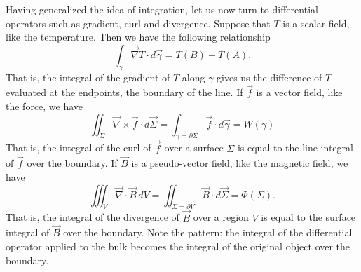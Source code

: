 Having generalized the idea of integration, let us now turn to differential operators such as gradient, curl and divergence. Suppose that $T$ is a scalar field, like the temperature. Then we have the following relationship
\begin{equation}\label{rp-cm-dg-gradientTheorem}
	\int_{\gamma} \vec{\nabla} T \cdot d\vec{\gamma} = T(B) - T(A).
\end{equation}
That is, the integral of the gradient of $T$ along $\gamma$ gives us the difference of $T$ evaluated at the endpoints, the boundary of the line. If $\vec{f}$ is a vector field, like the force, we have
\begin{equation}\label{rp-cm-dg-curlTheorem}
	\iint_{\Sigma} \vec{\nabla} \times \vec{f} \cdot d\vec{\Sigma} = \int_{\gamma = \partial \Sigma} \vec{f} \cdot d\vec{\gamma} = W(\gamma)
\end{equation}
That is, the integral of the curl of $\vec{f}$ over a surface $\Sigma$ is equal to the line integral of $\vec{f}$ over the boundary. If $\vec{B}$ is a pseudo-vector field, like the magnetic field, we have
\begin{equation}\label{rp-cm-dg-divergenceTheorem}
	\iiint_{V} \vec{\nabla} \cdot \vec{B} \, dV = \iint_{\Sigma = \partial V} \vec{B} \cdot d\vec{\Sigma} = \Phi(\Sigma).
\end{equation}
That is, the integral of the divergence of $\vec{B}$ over a region $V$ is equal to the surface integral of $\vec{B}$ over the boundary. Note the pattern: the integral of the differential operator applied to the bulk becomes the integral of the original object over the boundary.

